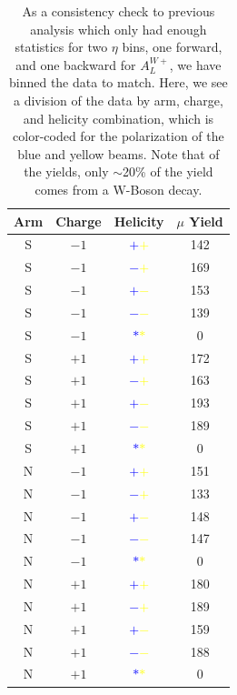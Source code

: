 \begin{table}
  \centering
  \begin{tabular}{cccc}
    \toprule
    \textbf{Arm} &
    \textbf{Charge} & 
    \textbf{Helicity} & 
    \textbf{$\mu$ Yield} \\ 
    \midrule
    S & $-1$ & \textbf{\textcolor{blue}{$+$}\textcolor{yellow}{$+$}}& 142 \\
    S & $-1$ & \textbf{\textcolor{blue}{$-$}\textcolor{yellow}{$+$}}& 169 \\
    S & $-1$ & \textbf{\textcolor{blue}{$+$}\textcolor{yellow}{$-$}}& 153 \\
    S & $-1$ & \textbf{\textcolor{blue}{$-$}\textcolor{yellow}{$-$}}& 139 \\
    S & $-1$ & \textbf{\textcolor{blue}{$*$}\textcolor{yellow}{$*$}}& 0 \\
    S & $+1$ & \textbf{\textcolor{blue}{$+$}\textcolor{yellow}{$+$}}& 172 \\
    S & $+1$ & \textbf{\textcolor{blue}{$-$}\textcolor{yellow}{$+$}}& 163 \\
    S & $+1$ & \textbf{\textcolor{blue}{$+$}\textcolor{yellow}{$-$}}& 193 \\
    S & $+1$ & \textbf{\textcolor{blue}{$-$}\textcolor{yellow}{$-$}}& 189 \\
    S & $+1$ & \textbf{\textcolor{blue}{$*$}\textcolor{yellow}{$*$}}& 0 \\
    N & $-1$ & \textbf{\textcolor{blue}{$+$}\textcolor{yellow}{$+$}}& 151 \\
    N & $-1$ & \textbf{\textcolor{blue}{$-$}\textcolor{yellow}{$+$}}& 133 \\
    N & $-1$ & \textbf{\textcolor{blue}{$+$}\textcolor{yellow}{$-$}}& 148 \\
    N & $-1$ & \textbf{\textcolor{blue}{$-$}\textcolor{yellow}{$-$}}& 147 \\
    N & $-1$ & \textbf{\textcolor{blue}{$*$}\textcolor{yellow}{$*$}}& 0 \\
    N & $+1$ & \textbf{\textcolor{blue}{$+$}\textcolor{yellow}{$+$}}& 180 \\
    N & $+1$ & \textbf{\textcolor{blue}{$-$}\textcolor{yellow}{$+$}}& 189 \\
    N & $+1$ & \textbf{\textcolor{blue}{$+$}\textcolor{yellow}{$-$}}& 159 \\
    N & $+1$ & \textbf{\textcolor{blue}{$-$}\textcolor{yellow}{$-$}}& 188 \\
    N & $+1$ & \textbf{\textcolor{blue}{$*$}\textcolor{yellow}{$*$}}& 0 \\
    \bottomrule
  \end{tabular}
  \caption{
    As a consistency check to previous analysis which only had enough statistics
    for two $\eta$ bins, one forward, and one backward for $A_L^{W+}$, we have
    binned the data to match. Here, we see a division of the data by arm,
    charge, and helicity combination, which is color-coded for the polarization
    of the blue and yellow beams. Note that of the yields, only $\sim$20\%
    of the yield comes from a W-Boson decay.
  }
  \label{tab:sorted_muons_standard}
\end{table}

